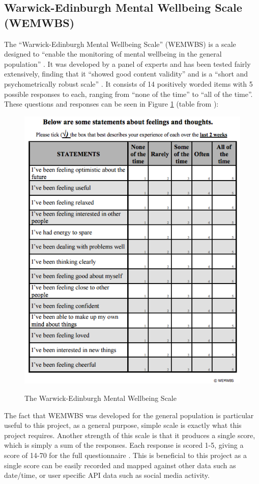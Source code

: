 \documentclass[11pt,openright,a4paper]{report}
\begin{document}
\subsection{Warwick-Edinburgh Mental Wellbeing Scale (WEMWBS)}
The \enquote{Warwick-Edinburgh Mental Wellbeing Scale} (WEMWBS) is a scale designed to \enquote{enable the monitoring of mental wellbeing in the general population} \parencite{wemwbs}. It was developed by a panel of experts \parencite{wemwbsdevelopment} and has been tested fairly extensively, finding that it \enquote{showed good content validity} and is a \enquote{short and psychometrically robust scale} \parencite{tennant2007warwick}. It consists of 14 positively worded items with 5 possible responses to each, ranging from \enquote{none of the time} to \enquote{all of the time}.
\newpage
These questions and responses can be seen in Figure \ref{fig:wemwbs} (table from \parencite{wemwbsquestions}):
\begin{figure}[ht]
\centering
\caption{The Warwick-Edinburgh Mental Wellbeing Scale}
\includegraphics[width=.8\textwidth]{i/wemwbs.png}
\label{fig:wemwbs}
\end{figure}

The fact that WEMWBS was developed for the general population is particular useful to this project, as a general purpose, simple scale is exactly what this project requires. Another strength of this scale is that it produces a single score, which is simply a sum of the responses. Each response is scored 1-5, giving a score of 14-70 for the full questionnaire \parencite{wemwbsscoring}. This is beneficial to this project as a single score can be easily recorded and mapped against other data such as date/time, or user specific API data such as social media activity.
\end{document}
